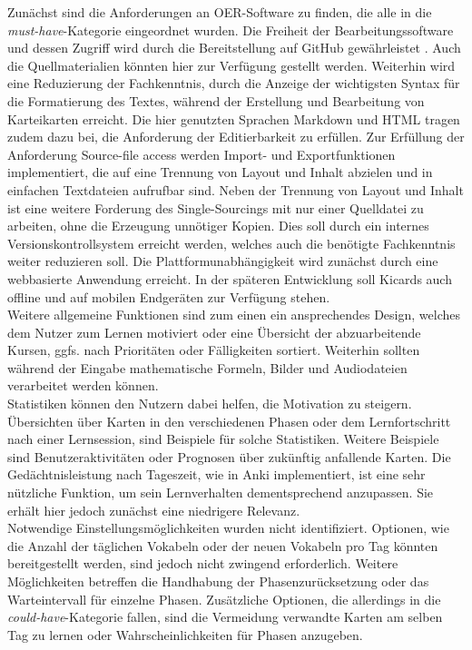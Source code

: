 Zunächst sind die Anforderungen an OER-Software zu finden, die alle in die \emph{must-have}-Kategorie eingeordnet wurden. 
Die Freiheit der Bearbeitungssoftware und dessen Zugriff wird durch die Bereitstellung auf GitHub gewährleistet \cite{kicards}. Auch die Quellmaterialien könnten hier zur Verfügung gestellt werden. 
Weiterhin wird eine Reduzierung der Fachkenntnis, durch die Anzeige der wichtigsten Syntax für die Formatierung des Textes, während der Erstellung und Bearbeitung von Karteikarten erreicht. Die hier genutzten Sprachen Markdown und HTML tragen zudem dazu bei, die Anforderung der Editierbarkeit zu erfüllen.
Zur Erfüllung der Anforderung \glqq Source-file access\grqq{} werden Import- und Exportfunktionen implementiert, die auf eine Trennung von Layout und Inhalt abzielen und in einfachen Textdateien aufrufbar sind. 
Neben der Trennung von Layout und Inhalt ist eine weitere Forderung des Single-Sourcings mit nur einer Quelldatei zu arbeiten, ohne die Erzeugung unnötiger Kopien. Dies soll durch ein internes Versionskontrollsystem erreicht werden, welches auch die benötigte Fachkenntnis weiter reduzieren soll. 
Die Plattformunabhängigkeit wird zunächst durch eine webbasierte Anwendung erreicht. In der späteren Entwicklung soll Kicards auch offline und auf mobilen Endgeräten zur Verfügung stehen. \\

Weitere allgemeine Funktionen sind zum einen ein ansprechendes Design, welches dem Nutzer zum Lernen motiviert oder eine Übersicht der abzuarbeitende Kursen, ggfs. nach Prioritäten oder Fälligkeiten sortiert. Weiterhin sollten während der Eingabe mathematische Formeln, Bilder und Audiodateien verarbeitet werden können. \\

Statistiken können den Nutzern dabei helfen, die Motivation zu steigern. Übersichten über Karten in den verschiedenen Phasen oder dem Lernfortschritt nach einer Lernsession, sind Beispiele für solche Statistiken. Weitere Beispiele sind Benutzeraktivitäten oder Prognosen über zukünftig anfallende Karten. Die Gedächtnisleistung nach Tageszeit, wie in Anki implementiert, ist eine sehr nützliche Funktion, um sein Lernverhalten dementsprechend anzupassen. Sie erhält hier jedoch zunächst eine niedrigere Relevanz. \\

Notwendige Einstellungsmöglichkeiten wurden nicht identifiziert. Optionen, wie die Anzahl der täglichen Vokabeln oder der neuen Vokabeln pro Tag könnten bereitgestellt werden, sind jedoch nicht zwingend erforderlich. Weitere Möglichkeiten betreffen die Handhabung der Phasenzurücksetzung oder das Warteintervall für einzelne Phasen. Zusätzliche Optionen, die allerdings in die \emph{could-have}-Kategorie fallen, sind die Vermeidung verwandte Karten am selben Tag zu lernen oder Wahrscheinlichkeiten für Phasen anzugeben. 

